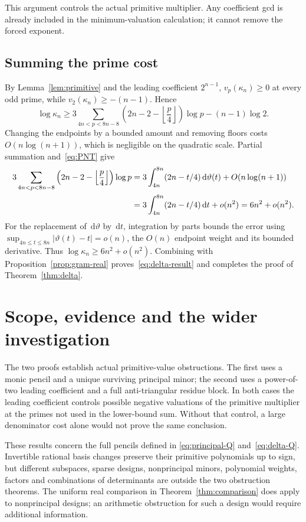 \documentclass[11pt]{article}
\theoremstyle{definition}
\theoremstyle{remark}
\numberwithin{equation}{section}
\newcommand{\dd}{\,\mathrm d}
\newcommand{\vp}{v_p}
\begin{document}
This argument controls the actual primitive multiplier. Any coefficient
gcd is already included in the minimum-valuation calculation; it cannot
remove the forced exponent.

\subsection{Summing the prime cost}

By Lemma~\ref{lem:primitive} and the leading coefficient $2^{n-1}$,
$\vp(\kappa_n)\geq0$ at every odd prime, while
$v_2(\kappa_n)\geq-(n-1)$. Hence
\begin{equation}\label{eq:kappa-sum}
 \log\kappa_n\geq
 3\sum_{4n<p<8n-8}\left(2n-2-\left\lfloor\frac p4\right\rfloor\right)
                   \log p-(n-1)\log2.
\end{equation}
Changing the endpoints by a bounded amount and removing floors costs
$O(n\log(n+1))$, which is negligible on the quadratic scale. Partial
summation and~\eqref{eq:PNT} give
\begin{align}
 3\sum_{4n<p<8n-8}\left(2n-2-\left\lfloor\frac p4\right\rfloor\right)
                   \log p
 &=3\int_{4n}^{8n}(2n-t/4)\dd\vartheta(t)+O(n\log(n+1))\notag\\
 &=3\int_{4n}^{8n}(2n-t/4)\dd t+o(n^2)
  =6n^2+o(n^2).\label{eq:six}
\end{align}
For the replacement of $\dd\vartheta$ by $\dd t$, integration by parts
bounds the error using $\sup_{4n\leq t\leq8n}|\vartheta(t)-t|=o(n)$,
the $O(n)$ endpoint weight and its bounded derivative.
Thus $\log\kappa_n\geq6n^2+o(n^2)$. Combining with
Proposition~\ref{prop:gram-real} proves~\eqref{eq:delta-result} and
completes the proof of Theorem~\ref{thm:delta}.

\section{Scope, evidence and the wider investigation}\label{sec:scope}

The two proofs establish actual primitive-value obstructions. The first
uses a monic pencil and a unique surviving principal minor; the second
uses a power-of-two leading coefficient and a full anti-triangular
residue block. In both cases the leading coefficient controls possible
negative valuations of the primitive multiplier at the primes not used
in the lower-bound sum. Without that control, a large denominator cost
alone would not prove the same conclusion.

These results concern the full pencils defined in
\eqref{eq:principal-Q} and~\eqref{eq:delta-Q}. Invertible rational basis
changes preserve their primitive polynomials up to sign, but different subspaces,
sparse designs, nonprincipal minors, polynomial weights, factors and
combinations of determinants are outside the two obstruction theorems.
The uniform real comparison in Theorem~\ref{thm:comparison} does apply
to nonprincipal designs; an arithmetic obstruction for such a design
would require additional information.
\end{document}
